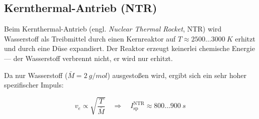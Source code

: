 ﻿\documentclass[12pt,a4paper]{article}
\newcommand{\Isp}{I_{\mathrm{sp}}}
\begin{document}
\subsection{Kernthermal-Antrieb (NTR)}

Beim Kernthermal-Antrieb (engl. \emph{Nuclear Thermal Rocket}, NTR) wird Wasserstoff
als Treibmittel durch einen Kernreaktor auf $T \approx 2500\ldots\SI{3000}{K}$ erhitzt
und durch eine Düse expandiert. Der Reaktor erzeugt keinerlei chemische Energie ---
der Wasserstoff verbrennt nicht, er wird nur erhitzt.

Da nur Wasserstoff ($\bar{M} = \SI{2}{g/mol}$) ausgestoßen wird, ergibt sich ein
sehr hoher spezifischer Impuls:

\[
  v_e \propto \sqrt{\frac{T}{\bar{M}}}
  \quad\Rightarrow\quad
  \Isp^{\mathrm{NTR}} \approx 800\ldots\SI{900}{s}
\]
\end{document}
